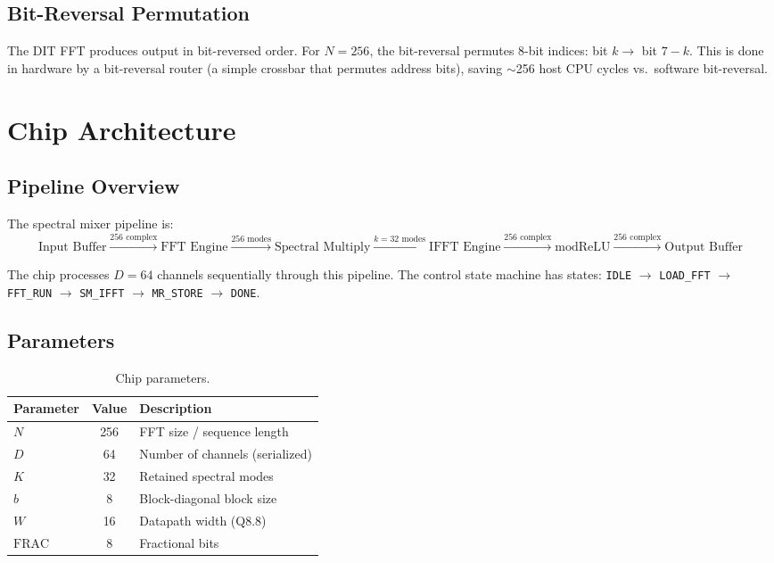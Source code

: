 \documentclass[11pt,a4paper]{article}
\theoremstyle{definition}
\theoremstyle{remark}
\begin{document}
\subsection{Bit-Reversal Permutation}

The DIT FFT produces output in bit-reversed order. For $N=256$, the bit-reversal
permutes 8-bit indices: bit $k \to$ bit $7-k$. This is done in hardware by a
bit-reversal router (a simple crossbar that permutes address bits), saving
$\sim$256 host CPU cycles vs.\ software bit-reversal.

\section{Chip Architecture}

\subsection{Pipeline Overview}

The spectral mixer pipeline is:
\begin{equation}
  \text{Input Buffer} \xrightarrow{\text{256 complex}} \text{FFT Engine}
  \xrightarrow{\text{256 modes}} \text{Spectral Multiply}
  \xrightarrow{k=32 \text{ modes}} \text{IFFT Engine}
  \xrightarrow{\text{256 complex}} \text{modReLU}
  \xrightarrow{\text{256 complex}} \text{Output Buffer}
\end{equation}

The chip processes $D=64$ channels sequentially through this pipeline. The
control state machine has states:
\texttt{IDLE} $\to$ \texttt{LOAD\_FFT} $\to$ \texttt{FFT\_RUN} $\to$
\texttt{SM\_IFFT} $\to$ \texttt{MR\_STORE} $\to$ \texttt{DONE}.

\subsection{Parameters}

\begin{table}[h]
\centering
\caption{Chip parameters.}
\label{tab:params}
\begin{tabular}{lc l}
\toprule
\textbf{Parameter} & \textbf{Value} & \textbf{Description} \\
\midrule
$N$ & 256 & FFT size / sequence length \\
$D$ & 64 & Number of channels (serialized) \\
$K$ & 32 & Retained spectral modes \\
$b$ & 8 & Block-diagonal block size \\
$W$ & 16 & Datapath width (Q8.8) \\
$\text{FRAC}$ & 8 & Fractional bits \\
\bottomrule
\end{tabular}
\end{table}
\end{document}
